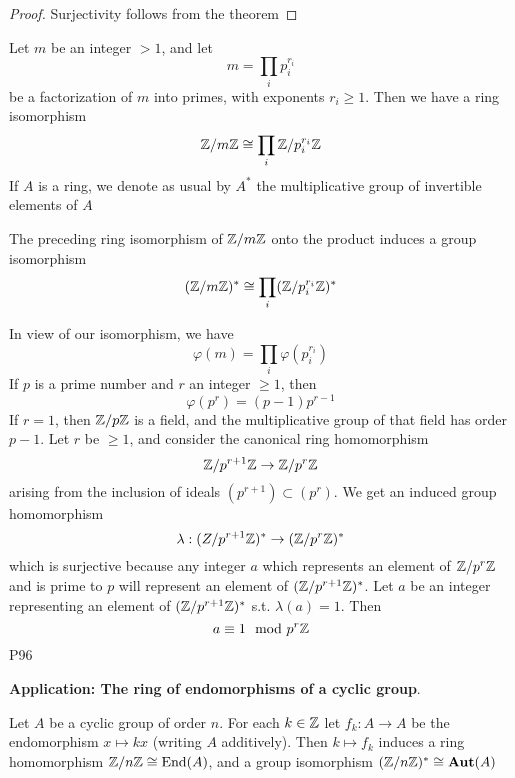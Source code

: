\documentclass[11pt]{article}
\begin{document}
\begin{proof}
Surjectivity follows from the theorem
\end{proof}

Let \(m\) be an integer \(>1\), and let
\begin{equation*}
m=\prod_ip_i^{r_i}
\end{equation*}
be a factorization of \(m\) into primes, with exponents \(r_i\ge 1\). Then we have a ring
isomorphism
\begin{equation*}
\mathbb{Z}/m\mathbb{Z}\cong\prod_i\mathbb{Z}/p_i^{r_i}\mathbb{Z}
\end{equation*}
If \(A\) is a ring, we denote as usual by \(A^*\) the multiplicative group of invertible elements
of \(A\)

\begin{proposition}[]
The preceding ring isomorphism of \(\mathbb{Z}/m\mathbb{Z}\) onto the product induces a group isomorphism
\begin{equation*}
(\mathbb{Z}/m\mathbb{Z})^*\cong\prod_i(\mathbb{Z}/p_i^{r_i}\mathbb{Z})^*
\end{equation*}
\end{proposition}

In view of our isomorphism, we have
\begin{equation*}
\varphi(m)=\prod_i\varphi(p_i^{r_i})
\end{equation*}
If \(p\) is a prime number and \(r\) an integer \(\ge 1\), then
\begin{equation*}
\varphi(p^r)=(p-1)p^{r-1}
\end{equation*}
If \(r=1\), then \(\mathbb{Z}/p\mathbb{Z}\) is a field, and the multiplicative group of that field has
order \(p-1\). Let \(r\) be \(\ge 1\), and consider the canonical ring homomorphism
\begin{equation*}
\mathbb{Z}/p^{r+1}\mathbb{Z}\to\mathbb{Z}/p^r\mathbb{Z}
\end{equation*}
arising from the inclusion of ideals \((p^{r+1})\subset(p^r)\). We get an induced group homomorphism
\begin{equation*}
\lambda:(Z/p^{r+1}\mathbb{Z})^*\to(\mathbb{Z}/p^r\mathbb{Z})^*
\end{equation*}
which is surjective because any integer \(a\) which represents an element of \(\mathbb{Z}/p^r\mathbb{Z}\) and is
prime to \(p\) will represent an element of \((\mathbb{Z}/p^{r+1}\mathbb{Z})^*\). Let \(a\) be an integer
representing an element of \((\mathbb{Z}/p^{r+1}\mathbb{Z})^*\) s.t. \(\lambda(a)=1\). Then
\begin{equation*}
a\equiv 1\mod p^{r}\mathbb{Z}
\end{equation*}
P96

\textbf{Application: The ring of endomorphisms of a cyclic group}.
\begin{theorem}[]
Let \(A\) be a cyclic group of order \(n\). For each \(k\in\mathbb{Z}\) let \(f_k:A\to A\) be the
endomorphism \(x\mapsto kx\) (writing \(A\) additively). Then \(k\mapsto f_k\) induces a ring
homomorphism \(\mathbb{Z}/n\mathbb{Z}\cong\operatorname{End}(A)\), and a group isomorphism \((\mathbb{Z}/n\mathbb{Z})^*\cong\operatorname{\textbf{Aut}}(A)\)
\end{theorem}
\end{document}
